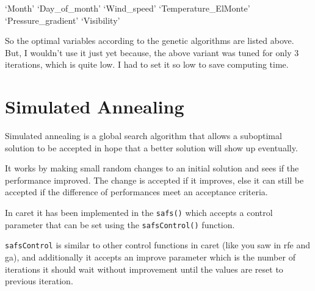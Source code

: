 \documentclass[]{book}
\newenvironment{Shaded}{\begin{snugshade}}{\end{snugshade}}
\newcommand{\CommentTok}[1]{\textcolor[rgb]{0.56,0.35,0.01}{\textit{#1}}}
\newcommand{\NormalTok}[1]{#1}
\newcommand{\OperatorTok}[1]{\textcolor[rgb]{0.81,0.36,0.00}{\textbf{#1}}}
\begin{document}
\begin{Shaded}
\end{Shaded}

`Month'
`Day\_of\_month'
`Wind\_speed'
`Temperature\_ElMonte'
`Pressure\_gradient'
`Visibility'

So the optimal variables according to the genetic algorithms are listed above. But, I wouldn't use it just yet because, the above variant was tuned for only 3 iterations, which is quite low. I had to set it so low to save computing time.

\hypertarget{simulated-annealing}{%
\section{Simulated Annealing}\label{simulated-annealing}}

Simulated annealing is a global search algorithm that allows a suboptimal solution to be accepted in hope that a better solution will show up eventually.

It works by making small random changes to an initial solution and sees if the performance improved. The change is accepted if it improves, else it can still be accepted if the difference of performances meet an acceptance criteria.

In caret it has been implemented in the \texttt{safs()} which accepts a control parameter that can be set using the \texttt{safsControl()} function.

\texttt{safsControl} is similar to other control functions in caret (like you saw in rfe and ga), and additionally it accepts an improve parameter which is the number of iterations it should wait without improvement until the values are reset to previous iteration.
\end{document}
